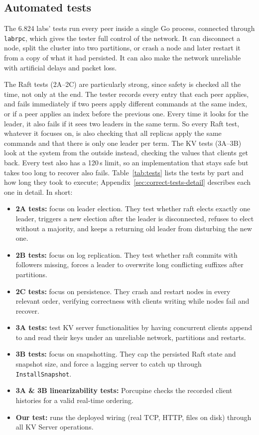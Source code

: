\documentclass[conference]{IEEEtran}
\begin{document}
\subsection{Automated tests}
\label{sec:correct-tests}

The 6.824 labs' tests run every peer inside a single Go process, connected through \texttt{labrpc}, which gives the tester full control of the network. It can disconnect a node, split the cluster into two partitions, or crash a node and later restart it from a copy of what it had persisted. It can also make the network unreliable with artificial delays and packet loss.

The Raft tests (2A--2C) are particularly strong, since safety is checked all the time, not only at the end. The tester records every entry that each peer applies, and fails immediately if two peers apply different commands at the same index, or if a peer applies an index before the previous one. Every time it looks for the leader, it also fails if it sees two leaders in the same term. So every Raft test, whatever it focuses on, is also checking that all replicas apply the same commands and that there is only one leader per term. The KV tests (3A--3B) look at the system from the outside instead, checking the values that clients get back. Every test also has a 120\,s limit, so an implementation that stays safe but takes too long to recover also fails. Table~\ref{tab:tests} lists the tests by part and how long they took to execute; Appendix~\ref{sec:correct-tests-detail} describes each one in detail. In short:

\begin{itemize}
\item \textbf{2A tests:} focus on leader election. They test whether raft elects exactly one leader, triggers a new election after the leader is disconnected, refuses to elect without a majority, and keeps a returning old leader from disturbing the new one.
\item \textbf{2B tests:} focus on log replication. They test whether raft commits with followers missing, forces a leader to overwrite long conflicting suffixes after partitions.
\item \textbf{2C tests:} focus on persistence. They crash and restart nodes in every relevant order, verifying correctness with clients writing while nodes fail and recover.
\item \textbf{3A tests:} test KV server functionalities by having concurrent clients append to and read their keys under an unreliable network, partitions and restarts.
\item \textbf{3B tests:} focus on snapshotting. They cap the persisted Raft state and snapshot size, and force a lagging server to catch up through \texttt{InstallSnapshot}.
\item \textbf{3A \& 3B linearizability tests:} Porcupine checks the recorded client histories for a valid real-time ordering.
\item \textbf{Our test:} runs the deployed wiring (real TCP, HTTP, files on disk) through all KV Server operations.
\end{itemize}
\end{document}
